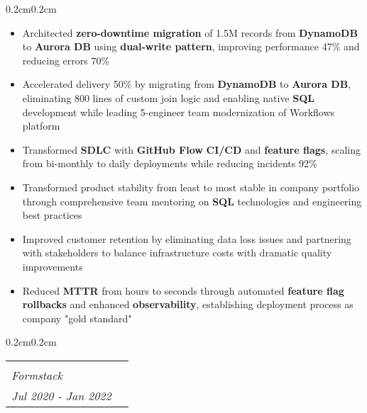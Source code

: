 \documentclass[10pt, letterpaper]{article}
\makeatletter
\newenvironment{highlights}{
    \begin{itemize}[
        topsep=0.10 cm,
        parsep=0.10 cm,
        partopsep=0pt,
        itemsep=0pt,
        leftmargin=0.4 cm + 10pt
    ]
}{
    \end{itemize}
}
\newenvironment{onecolentry}{
    \begin{adjustwidth}{0.2cm}{0.2cm}
}{
    \end{adjustwidth}
}
\newcommand{\jobentry}[4]{
    \begin{onecolentry}
        \noindent
        \begin{tabularx}{\textwidth}{@{}X>{\raggedleft\arraybackslash}p{3cm}@{\hspace{0.2cm}}}
            \begin{tabular}[t]{@{}l@{}}
                \textbf{#1}\\
                \textit{#2}
            \end{tabular} &
            \begin{tabular}[t]{@{}r@{}}
                #4\\
                \textit{#3}
            \end{tabular}
        \end{tabularx}
    \end{onecolentry}
}
\makeatother
\begin{document}
    \vspace{0.10cm}
    \begin{onecolentry}
        \begin{highlights}
            \item Architected \textbf{zero-downtime migration} of 1.5M records from \textbf{DynamoDB} to \textbf{Aurora DB} using \textbf{dual-write pattern}, improving performance 47\% and reducing errors 70\%
            \item Accelerated delivery 50\% by migrating from \textbf{DynamoDB} to \textbf{Aurora DB}, eliminating 800 lines of custom join logic and enabling native \textbf{SQL} development while leading 5-engineer team modernization of Workflows platform
            \item Transformed \textbf{SDLC} with \textbf{GitHub Flow} \textbf{CI/CD} and \textbf{feature flags}, scaling from bi-monthly to daily deployments while reducing incidents 92\%
            \item Transformed product stability from least to most stable in company portfolio through comprehensive team mentoring on \textbf{SQL} technologies and engineering best practices
            \item Improved customer retention by eliminating data loss issues and partnering with stakeholders to balance infrastructure costs with dramatic quality improvements
            \item Reduced \textbf{MTTR} from hours to seconds through automated \textbf{feature flag rollbacks} and enhanced \textbf{observability}, establishing deployment process as company "gold standard"
        \end{highlights}
    \end{onecolentry}
    
    \vspace{0.3cm}
    \jobentry{Senior Software Developer}{Formstack}{Jul 2020 - Jan 2022}{Remote}
\end{document}
